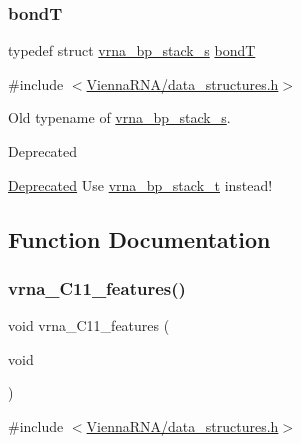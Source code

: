 \subsubsection{\texorpdfstring{bondT}{bondT}}
{\footnotesize\ttfamily typedef struct \hyperlink{group__data__structures_structvrna__bp__stack__s}{vrna\+\_\+bp\+\_\+stack\+\_\+s} \hyperlink{group__data__structures_gaaeed53a7508c6ce549a98223e94b25df}{bondT}}



{\ttfamily \#include $<$\hyperlink{data__structures_8h}{Vienna\+R\+N\+A/data\+\_\+structures.\+h}$>$}



Old typename of \hyperlink{group__data__structures_structvrna__bp__stack__s}{vrna\+\_\+bp\+\_\+stack\+\_\+s}. 

\begin{DoxyRefDesc}{Deprecated}
\item[\hyperlink{deprecated__deprecated000050}{Deprecated}]Use \hyperlink{group__data__structures_gaa651bda42e7692f08cb603cd6834b0ee}{vrna\+\_\+bp\+\_\+stack\+\_\+t} instead! \end{DoxyRefDesc}


\subsection{Function Documentation}
\mbox{\label{group__data__structures_ga21744ae2d6a17309f9327d3547cef0cb}} 
\subsubsection{\texorpdfstring{vrna\+\_\+\+C11\+\_\+features()}{vrna\_C11\_features()}}
{\footnotesize\ttfamily void vrna\+\_\+\+C11\+\_\+features (\begin{DoxyParamCaption}\item[{void}]{ }\end{DoxyParamCaption})}



{\ttfamily \#include $<$\hyperlink{data__structures_8h}{Vienna\+R\+N\+A/data\+\_\+structures.\+h}$>$}



